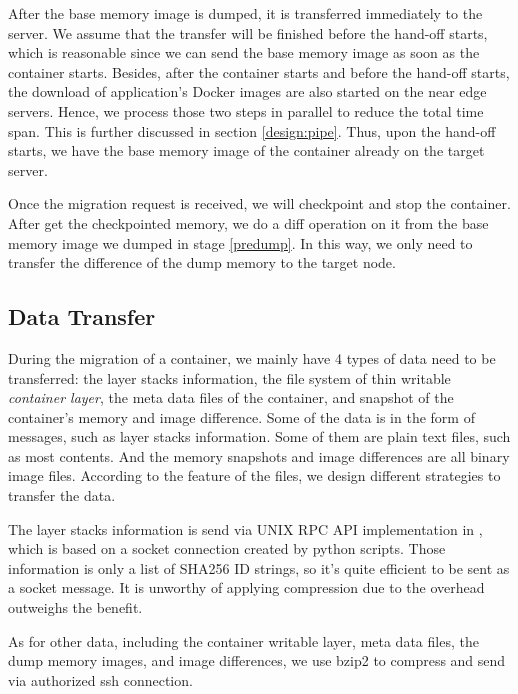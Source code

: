 After the base memory image is dumped, it is transferred immediately to the server. We assume that the transfer will be finished before the hand-off starts, which is reasonable since we can send the base memory image as soon as the container starts. 
Besides, after the container starts and before the hand-off starts, the download of application's Docker images are also started on the near edge servers. 
Hence, we process those two steps in parallel to reduce the total time span. This is further discussed in section \ref{design:pipe}. Thus, upon the hand-off starts, we have the base memory image of the container already on the target server. 

Once the migration request is received, we will checkpoint and stop the container. After get the checkpointed memory, we do a diff operation on it from the base memory image we dumped in stage \ref{predump}. 
In this way, we only need to transfer the difference of the dump memory to the target node. 

\subsection{Data Transfer}\label{design:compression}

During the migration of a container, we mainly have 4 types of data need to be transferred:
the layer stacks information, the file system of thin writable \textit{container layer}, the meta data files of the container, and snapshot of the container's memory and image difference. Some of the data is in the form of messages, such as layer stacks information. Some of them are plain text files, such as most contents. And the memory snapshots and image differences are all binary image files. According to the feature of the files, we design different strategies to transfer the data.

The layer stacks information is send via UNIX RPC API implementation in \cite{phaul}, which is based on a socket connection created by python scripts. Those information is only a list of SHA256 ID strings, so it's quite efficient to be sent as a socket message. It is unworthy of applying compression due to the overhead outweighs the benefit.

As for other data, including the container writable layer, meta data files, the dump memory images, and image differences, we use bzip2 to compress and send via authorized ssh connection.

